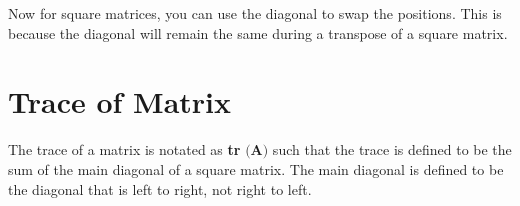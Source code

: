 Now for square matrices, you can use the diagonal to swap the positions. This is because the diagonal will remain the same during a transpose of a square matrix.

\section{Trace of Matrix}
The trace of a matrix is notated as \textbf{tr} $($\textbf{A}$)$ such that the trace is defined to be the sum of the main diagonal of a square matrix. The main diagonal is defined to be the diagonal that is left to right, not right to left. 
